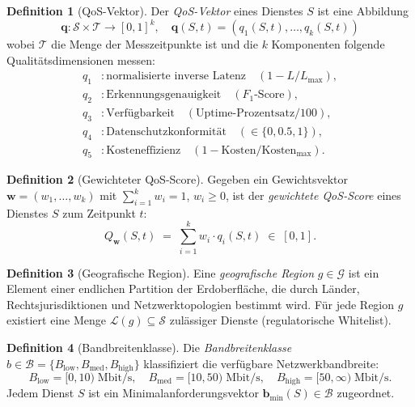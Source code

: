 ﻿\documentclass[a4paper,12pt]{article}
\theoremstyle{definition}
\newtheorem{definition}{Definition}
\begin{document}
\begin{definition}[QoS-Vektor]
\label{def:qos}
Der \emph{QoS-Vektor} eines Dienstes $S$ ist eine Abbildung
\[
    \mathbf{q}: \mathcal{S} \times \mathcal{T} \to [0,1]^k, \quad \mathbf{q}(S, t) = (q_1(S,t), \ldots, q_k(S,t))
\]
wobei $\mathcal{T}$ die Menge der Messzeitpunkte ist und die $k$ Komponenten folgende Qualitätsdimensionen messen:
\begin{align*}
q_1 &: \text{normalisierte inverse Latenz} \quad (1 - L/L_{\max}), \\
q_2 &: \text{Erkennungsgenauigkeit} \quad (F_1\text{-Score}), \\
q_3 &: \text{Verfügbarkeit} \quad (\text{Uptime-Prozentsatz} / 100), \\
q_4 &: \text{Datenschutzkonformität} \quad (\in \{0, 0.5, 1\}), \\
q_5 &: \text{Kosteneffizienz} \quad (1 - \mathrm{Kosten}/\mathrm{Kosten}_{\max}).
\end{align*}
\end{definition}

\begin{definition}[Gewichteter QoS-Score]
\label{def:score}
Gegeben ein Gewichtsvektor $\mathbf{w} = (w_1, \ldots, w_k)$ mit $\sum_{i=1}^k w_i = 1$, $w_i \geq 0$, ist der \emph{gewichtete QoS-Score} eines Dienstes $S$ zum Zeitpunkt $t$:
\[
    Q_{\mathbf{w}}(S, t) \;=\; \sum_{i=1}^{k} w_i \cdot q_i(S, t) \;\in\; [0, 1].
\]
\end{definition}

\begin{definition}[Geografische Region]
\label{def:region}
Eine \emph{geografische Region} $g \in \mathcal{G}$ ist ein Element einer endlichen Partition der Erdoberfläche, die durch Länder, Rechtsjurisdiktionen und Netzwerktopologien bestimmt wird. Für jede Region $g$ existiert eine Menge $\mathcal{L}(g) \subseteq \mathcal{S}$ zulässiger Dienste (regulatorische Whitelist).
\end{definition}

\begin{definition}[Bandbreitenklasse]
\label{def:bandbreite}
Die \emph{Bandbreitenklasse} $b \in \mathcal{B} = \{B_\mathrm{low}, B_\mathrm{med}, B_\mathrm{high}\}$ klassifiziert die verfügbare Netzwerkbandbreite:
\[
    B_\mathrm{low} = [0, 10)\;\mathrm{Mbit/s}, \quad
    B_\mathrm{med} = [10, 50)\;\mathrm{Mbit/s}, \quad
    B_\mathrm{high} = [50, \infty)\;\mathrm{Mbit/s}.
\]
Jedem Dienst $S$ ist ein Minimalanforderungsvektor $\mathbf{b}_{\min}(S) \in \mathcal{B}$ zugeordnet.
\end{definition}
\end{document}
